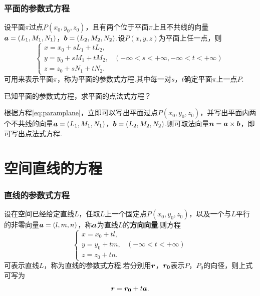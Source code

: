 \subsubsection*{平面的参数式方程}
\par 设平面$\pi$过点$P(x_0,y_0,z_0)$，且有两个位于平面$\pi$上且不共线的向量$\vb*{a}=(L_1,M_1,N_1)$，$\vb*{b}=(L_2,M_2,N_2)$.设$P(x,y,z)$为平面上任一点，则
\begin{equation}\label{eq:paramplane}
  \begin{cases}
    x = x_0+sL_1+tL_2,                                         \\
    y = y_0+sM_1+tM_2, & (-\infty<s<+\infty,-\infty<t<+\infty) \\
    z = z_0+sN_1+tN_2.
  \end{cases}
\end{equation}
可用来表示平面$\pi$，称为平面的参数式方程.其中每一对$s$，$t$确定平面$\pi$上一点$P$.
\begin{example}
  已知平面的参数式方程，求平面的点法式方程？
  \begin{solution}
    根据方程\ref{eq:paramplane}，立即可以写出平面过点$P(x_0,y_0,z_0)$，并写出平面内两个不共线的向量$\vb*{a}=(L_1,M_1,N_1)$，$\vb*{b}=(L_2,M_2,N_2)$.则可取法向量$\vb*{n}=\vb*{a} \times \vb*{b}$，即可写出点法式方程.
  \end{solution}
\end{example}

\section{空间直线的方程}
\subsubsection*{直线的参数式方程}
\par 设在空间已经给定直线$L$，任取$L$上一个固定点$P(x_0,y_0,z_0)$，以及一个与$L$平行的非零向量$\vb*{a}=(l,m,n)$，称$\vb*{a}$为直线$L$的\textbf{方向向量}.则方程
\begin{equation}\label{eq:paramline}
  \begin{cases}
    x = x_0+tl,                       \\
    y = y_0+tm, & (-\infty<t<+\infty) \\
    z = z_0+tn.
  \end{cases}
\end{equation}
可表示直线$L$，称为直线的参数式方程.若分别用$\vb*{r}$，$\vb*{r_0}$表示$P$，$P_0$的向径，则上式可写为
\begin{equation}
  \vb*{r}=\vb*{r_0}+t\vb*{a}.
\end{equation}
